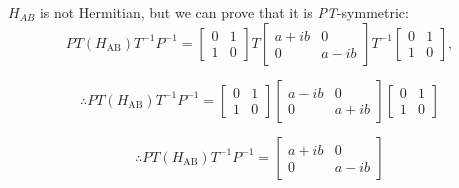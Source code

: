 \documentclass[10pt, a4paper, singlespacing]{report}
\newcommand\PT{\emph{PT}}
\begin{document}
$H_{AB}$ is not Hermitian, but we can prove that it is \PT-symmetric:
\begin{equation} \label{eq:6}
PT(H_{\mathrm{AB}})T^{-1}P^{-1} = \begin{bmatrix}
0 & 1 \\ 
1 & 0
\end{bmatrix}
T
\begin{bmatrix}
a+ib & 0 \\ 
0 & a-ib
\end{bmatrix}
T^{-1}
\begin{bmatrix}
0 & 1 \\ 
1 & 0
\end{bmatrix},
\end{equation}

\begin{equation} \label{eq:7}
\therefore PT(H_{\mathrm{AB}})T^{-1}P^{-1} = \begin{bmatrix}
0 & 1 \\ 
1 & 0
\end{bmatrix}
\begin{bmatrix}
a-ib & 0 \\ 
0 & a+ib
\end{bmatrix}
\begin{bmatrix}
0 & 1 \\ 
1 & 0
\end{bmatrix}
\end{equation}

\begin{equation} \label{eq:8}
\therefore PT(H_{\mathrm{AB}})T^{-1}P^{-1} = 
\begin{bmatrix}
a+ib & 0 \\ 
0 & a-ib
\end{bmatrix}
\end{equation}
\end{document}
